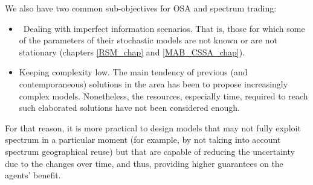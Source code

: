 We also have two common sub-objectives for OSA and spectrum trading:
\begin{itemize}
\item Dealing with imperfect information scenarios. That is, those for which some of the parameters of their stochastic models are not known or are not stationary (chapters \ref{RSM_chap} and \ref{MAB_CSSA_chap}). 
\item Keeping complexity low. The main tendency of previous (and contemporaneous) solutions in the area has been to propose increasingly complex models. Nonetheless, the resources, especially time, required to reach such elaborated solutions have not been considered enough.
\end{itemize}
For that reason, it is more practical to design models that may not fully exploit spectrum in a particular moment (for example, by not taking into account spectrum geographical reuse) but that are capable of reducing the uncertainty due to the changes over time, and thus, providing higher guarantees on the agents’ benefit. 



